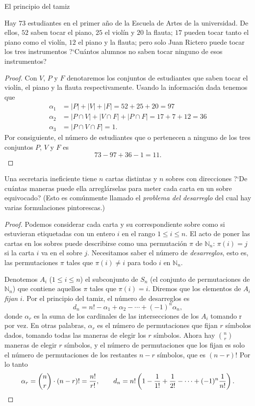 \begin{section}{El principio del tamiz}
\begin{ejemplo} Hay $73$ estudiantes en el primer año de la Escuela de Artes de la universidad. De ellos, $52$ saben tocar el piano, $25$ el violín y $20$ la flauta; $17$ pueden tocar tanto el piano como el violín, $12$ el piano y la flauta; pero solo Juan Rictero puede tocar los tres instrumentos ?`Cuántos alumnos no saben tocar ninguno de esos instrumentos?
\end{ejemplo}
\begin{proof} Con $V$, $P$ y $F$ denotaremos los conjuntos de estudiantes que saben tocar el violín, el piano y la flauta
respectivamente. Usando la información dada tenemos que $$
\begin{aligned}
\alpha_1&= |P| + |V| + |F|= 52+25+20=97 \\
\alpha_2&= |P\cap V| + |V\cap F| + |P\cap F|=17+7+12=36 \\
\alpha_3&= |P\cap V\cap F|= 1.
\end{aligned}
$$
Por consiguiente, el número de estudiantes que o pertenecen a ninguno de los tres conjuntos $P$, $V$ y $F$ es
$$
73-97+36-1=11.
$$
\end{proof}

\begin{ejemplo} Una secretaria ineficiente tiene $n$ cartas distintas y $n$ sobres con direcciones ?`De cuántas maneras puede
ella arreglárselas para meter cada carta en un sobre equivocado? (Esto es comúnmente llamado el {\it problema del desarreglo} del
cual hay varias formulaciones pintorescas.) 
\end{ejemplo}


\begin{proof} Podemos considerar cada carta y su correspondiente sobre  como si estuvieran etiquetadas con un entero $i$ en el rango $1 \le i \le n$. El acto de poner las cartas en los sobres puede describirse como una permutación $\pi$  de $\mathbb N_n$: $\pi(i)=j$ si la carta $i$ va en el sobre $j$. Necesitamos saber  el número de {\em desarreglos}, esto es, las permutaciones $\pi$ tales que
$\pi(i)\not=i$ para todo $i$ en $\mathbb N_n$.

Denotemos $A_i$ ($1 \le i \le n$) el subconjunto de $S_n$ (el conjunto de permutaciones de $\mathbb N_n$) que contiene aquellos $\pi$ tales que $\pi(i)=i$. Diremos que los elementos de $A_i$
{\it fijan} $i$. Por el principio del tamiz, el número de desarreglos es 
$$
d_n= n! -\alpha_1+\alpha_2 - \cdots +(-1)^n\alpha_n,
$$
donde $\alpha_r$ es la suma de los cardinales de las intersecciones de los $A_i$ tomando r por vez. En otras palabras, $\alpha_r$ es el número de permutaciones que fijan $r$ símbolos
dados, tomando todas las maneras de elegir los $r$ símbolos. Ahora hay $\binom{n}{r} $ maneras de elegir $r$ símbolos, y el número de permutaciones que los fijan es solo el número de permutaciones de
los restantes $n-r$ símbolos, que es $(n-r)!$  Por lo tanto
$$
\alpha_r = \binom{n}{r} \cdot (n-r)! = \frac{n!}{r!},\qquad d_n=
n!\left(1-\frac{1}{1!} + \frac{1}{2!}-\cdots
+(-1)^n\frac{1}{n!}\right). \nopagebreak$$
\end{proof}


\end{section}

